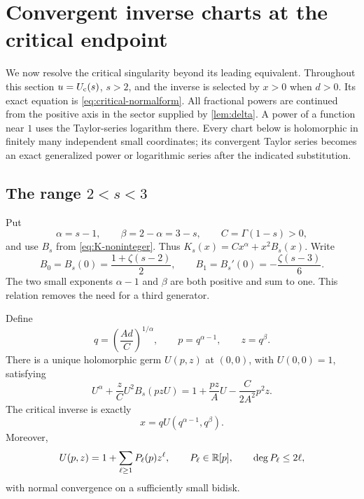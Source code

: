 \section{Convergent inverse charts at the critical endpoint}
\label{sec:charts}

We now resolve the critical singularity beyond its leading equivalent.
Throughout this section $u=U_{\mathrm c}(s)$, $s>2$, and the inverse is selected by
$x>0$ when $d>0$.  Its exact equation is
\eqref{eq:critical-normalform}.  All fractional powers are continued
from the positive axis in the sector supplied by \cref{lem:delta}.
A power of a function near $1$ uses the Taylor-series logarithm there.
Every chart below is holomorphic in finitely many independent small
coordinates; its convergent Taylor series becomes an exact generalized
power or logarithmic series after the indicated substitution.

\subsection{The range \texorpdfstring{$2<s<3$}{2<s<3}}

Put
\[
 \alpha=s-1,\qquad \beta=2-\alpha=3-s,\qquad
 C=\Gamma(1-s)>0,
\]
and use $B_s$ from \eqref{eq:K-noninteger}.  Thus
$K_s(x)=Cx^\alpha+x^2B_s(x)$.  Write
\[
 B_0=B_s(0)=\frac{1+\zeta(s-2)}2,\qquad
 B_1=B_s'(0)=-\frac{\zeta(s-3)}6.
\]
The two small exponents $\alpha-1$ and $\beta$ are both positive
and sum to one.  This relation removes the need for a third generator.

\begin{theorem}
\label{thm:chart-low}
Define
\begin{equation}\label{eq:chart-low-coordinates}
 q=\left(\frac{Ad}{C}\right)^{1/\alpha},\qquad
 p=q^{\alpha-1},\qquad z=q^\beta.
\end{equation}
There is a unique holomorphic germ $U(p,z)$ at $(0,0)$, with
$U(0,0)=1$, satisfying
\begin{equation}\label{eq:chart-low-equation}
 U^\alpha+\frac zC U^2 B_s(pzU)
 =1+\frac{pz}{A}U-\frac{C}{2A^2}p^2z.
\end{equation}
The critical inverse is exactly
\begin{equation}\label{eq:chart-low-inverse}
 x=qU(q^{\alpha-1},q^\beta).
\end{equation}
Moreover,
\begin{equation}\label{eq:chart-low-sectors}
 U(p,z)=1+\sum_{\ell\ge1}P_\ell(p)z^\ell,
 \qquad P_\ell\in\mathbb R[p],\qquad \deg P_\ell\le2\ell,
\end{equation}
with normal convergence on a sufficiently small bidisk.
\end{theorem}


